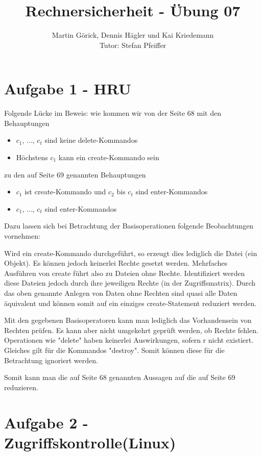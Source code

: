 \documentclass{scrartcl}
\title{Rechnersicherheit - Übung 07}
\author{Martin Görick, Dennis Hägler und Kai Kriedemann \\ Tutor: Stefan Pfeiffer}
\begin{document}
\maketitle


\section*{Aufgabe 1 - HRU}
Folgende Lücke im Beweis: wie kommen wir von der Seite 68 mit den Behauptungen
\begin{itemize}
  \item $c_{1}$, ..., $c_{t}$ sind keine delete-Kommandos
  \item Höchstens $c_{1}$ kann ein create-Kommando sein
\end{itemize}

zu den auf Seite 69 genannten Behauptungen
\begin{itemize}
  \item $c_{1}$ ist create-Kommando und $c_{2}$ bis $c_{t}$ sind enter-Kommandos
  \item $c_{1}$, ..., $c_{t}$ sind enter-Kommandos
\end{itemize}

Dazu lassen sich bei Betrachtung der Basisoperationen folgende Beobachtungen vornehmen:

Wird ein create-Kommando durchgeführt, so erzeugt dies lediglich die Datei (ein Objekt).
Es können jedoch keinerlei Rechte gesetzt werden. Mehrfaches Ausführen von create führt also
zu Dateien ohne Rechte. Identifiziert werden diese Dateien jedoch durch ihre jeweiligen Rechte
(in der Zugriffsmatrix). Durch das oben genannte Anlegen von Daten ohne Rechten sind quasi
alle Daten äquivalent und können somit auf ein einziges create-Statement reduziert werden.

Mit den gegebenen Basisoperatoren kann man lediglich das Vorhandensein von Rechten prüfen.
Es kann aber nicht umgekehrt geprüft werden, ob Rechte fehlen. Operationen wie "delete"
haben keinerlei Auswirkungen, sofern r nicht existiert. Gleiches gilt für die Kommandos
"destroy". Somit können diese für die Betrachtung ignoriert werden.

Somit kann man die auf Seite 68 genannten Aussagen auf die auf Seite 69 reduzieren.


\section*{Aufgabe 2 - Zugriffskontrolle(Linux)}
\end{document}
